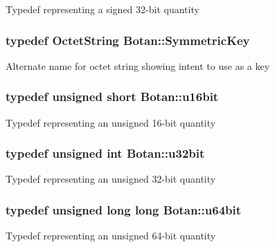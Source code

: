 Typedef representing a signed 32-\/bit quantity \hypertarget{namespaceBotan_a00c78597211d5c63b63e2a57ddb96d38}{
\subsubsection[{Symmetric\-Key}]{\setlength{\rightskip}{0pt plus 5cm}typedef {\bf Octet\-String} {\bf Botan\-::\-Symmetric\-Key}}}\label{namespaceBotan_a00c78597211d5c63b63e2a57ddb96d38}
Alternate name for octet string showing intent to use as a key \hypertarget{namespaceBotan_ab07face63a00c39ea6ed97f203ee501c}{
\subsubsection[{u16bit}]{\setlength{\rightskip}{0pt plus 5cm}typedef unsigned short {\bf Botan\-::u16bit}}}\label{namespaceBotan_ab07face63a00c39ea6ed97f203ee501c}
Typedef representing an unsigned 16-\/bit quantity \hypertarget{namespaceBotan_aacc7d03c95e97e76168fc1c819031830}{
\subsubsection[{u32bit}]{\setlength{\rightskip}{0pt plus 5cm}typedef unsigned int {\bf Botan\-::u32bit}}}\label{namespaceBotan_aacc7d03c95e97e76168fc1c819031830}
Typedef representing an unsigned 32-\/bit quantity \hypertarget{namespaceBotan_a634063d9fb05e25262ca94ed927030f6}{
\subsubsection[{u64bit}]{\setlength{\rightskip}{0pt plus 5cm}typedef unsigned long long {\bf Botan\-::u64bit}}}\label{namespaceBotan_a634063d9fb05e25262ca94ed927030f6}
Typedef representing an unsigned 64-\/bit quantity 

